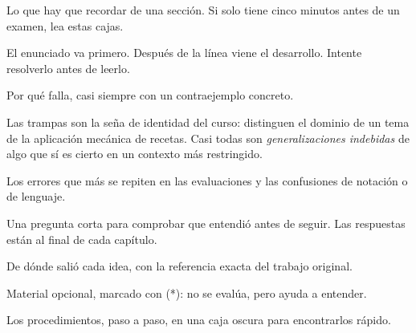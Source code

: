 \begin{ideaclave}
Lo que hay que recordar de una sección. Si solo tiene cinco minutos antes de un examen, lea estas cajas.
\end{ideaclave}

\begin{ejemplo}[title={\textcolor{snlvioleta}{\faPencil*}\hspace{0.45em}Ejemplo 11.5: título del ejemplo}]{}
El enunciado va primero.
\solucion Después de la línea viene el desarrollo. Intente resolverlo antes de leerlo.
\end{ejemplo}

\begin{trampa}[title={\faBug\hspace{0.45em}Trampa 11.2: así se ve una trampa}]{}
Por qué falla, casi siempre con un contraejemplo concreto.
\end{trampa}

Las trampas son la seña de identidad del curso: distinguen el dominio de un tema de la aplicación mecánica de recetas. Casi todas son \emph{generalizaciones indebidas} de algo que sí es cierto en un contexto más restringido.

\begin{cuidado}
Los errores que más se repiten en las evaluaciones y las confusiones de notación o de lenguaje.
\end{cuidado}

\begin{pausa}[title={\textcolor{snlverde}{\faPauseCircle}\hspace{0.45em}Pausa activa 11.3}]
Una pregunta corta para comprobar que entendió antes de seguir. Las respuestas están al final de cada capítulo.
\end{pausa}

\begin{historia}
De dónde salió cada idea, con la referencia exacta del trabajo original.
\end{historia}

\begin{profundiza}
Material opcional, marcado con (*): no se evalúa, pero ayuda a entender.
\end{profundiza}

\begin{receta}[Procedimiento]
Los procedimientos, paso a paso, en una caja oscura para encontrarlos rápido.
\end{receta}

